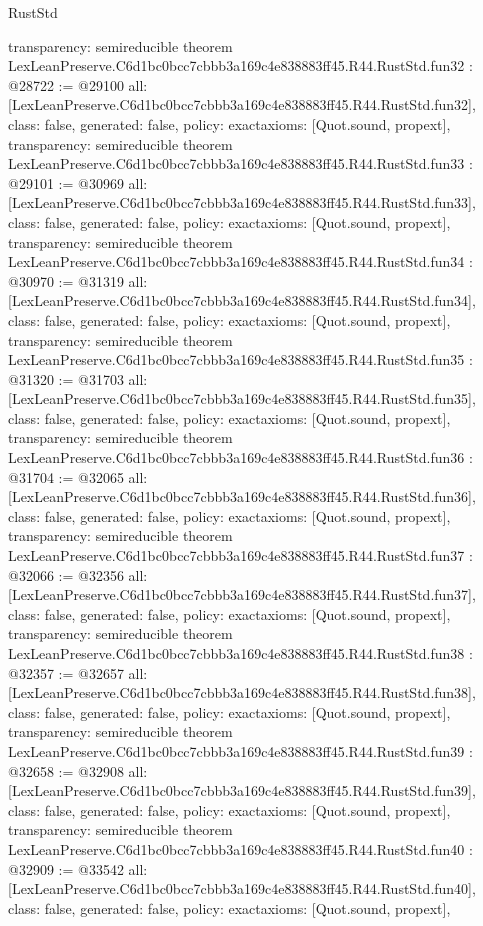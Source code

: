 \begin{lexlean}{RustStd}
\begin{coremodule}
{  transparency: semireducible
}
theorem LexLeanPreserve.C6d1bc0bcc7cbbb3a169c4e838883ff45.R44.RustStd.fun32 : @28722 := @29100 {
  all: [LexLeanPreserve.C6d1bc0bcc7cbbb3a169c4e838883ff45.R44.RustStd.fun32],
  class: false,
  generated: false,
  policy: exact{axioms: [Quot.sound, propext]},
  transparency: semireducible
}
theorem LexLeanPreserve.C6d1bc0bcc7cbbb3a169c4e838883ff45.R44.RustStd.fun33 : @29101 := @30969 {
  all: [LexLeanPreserve.C6d1bc0bcc7cbbb3a169c4e838883ff45.R44.RustStd.fun33],
  class: false,
  generated: false,
  policy: exact{axioms: [Quot.sound, propext]},
  transparency: semireducible
}
theorem LexLeanPreserve.C6d1bc0bcc7cbbb3a169c4e838883ff45.R44.RustStd.fun34 : @30970 := @31319 {
  all: [LexLeanPreserve.C6d1bc0bcc7cbbb3a169c4e838883ff45.R44.RustStd.fun34],
  class: false,
  generated: false,
  policy: exact{axioms: [Quot.sound, propext]},
  transparency: semireducible
}
theorem LexLeanPreserve.C6d1bc0bcc7cbbb3a169c4e838883ff45.R44.RustStd.fun35 : @31320 := @31703 {
  all: [LexLeanPreserve.C6d1bc0bcc7cbbb3a169c4e838883ff45.R44.RustStd.fun35],
  class: false,
  generated: false,
  policy: exact{axioms: [Quot.sound, propext]},
  transparency: semireducible
}
theorem LexLeanPreserve.C6d1bc0bcc7cbbb3a169c4e838883ff45.R44.RustStd.fun36 : @31704 := @32065 {
  all: [LexLeanPreserve.C6d1bc0bcc7cbbb3a169c4e838883ff45.R44.RustStd.fun36],
  class: false,
  generated: false,
  policy: exact{axioms: [Quot.sound, propext]},
  transparency: semireducible
}
theorem LexLeanPreserve.C6d1bc0bcc7cbbb3a169c4e838883ff45.R44.RustStd.fun37 : @32066 := @32356 {
  all: [LexLeanPreserve.C6d1bc0bcc7cbbb3a169c4e838883ff45.R44.RustStd.fun37],
  class: false,
  generated: false,
  policy: exact{axioms: [Quot.sound, propext]},
  transparency: semireducible
}
theorem LexLeanPreserve.C6d1bc0bcc7cbbb3a169c4e838883ff45.R44.RustStd.fun38 : @32357 := @32657 {
  all: [LexLeanPreserve.C6d1bc0bcc7cbbb3a169c4e838883ff45.R44.RustStd.fun38],
  class: false,
  generated: false,
  policy: exact{axioms: [Quot.sound, propext]},
  transparency: semireducible
}
theorem LexLeanPreserve.C6d1bc0bcc7cbbb3a169c4e838883ff45.R44.RustStd.fun39 : @32658 := @32908 {
  all: [LexLeanPreserve.C6d1bc0bcc7cbbb3a169c4e838883ff45.R44.RustStd.fun39],
  class: false,
  generated: false,
  policy: exact{axioms: [Quot.sound, propext]},
  transparency: semireducible
}
theorem LexLeanPreserve.C6d1bc0bcc7cbbb3a169c4e838883ff45.R44.RustStd.fun40 : @32909 := @33542 {
  all: [LexLeanPreserve.C6d1bc0bcc7cbbb3a169c4e838883ff45.R44.RustStd.fun40],
  class: false,
  generated: false,
  policy: exact{axioms: [Quot.sound, propext]},
}
\end{coremodule}
\end{lexlean}
